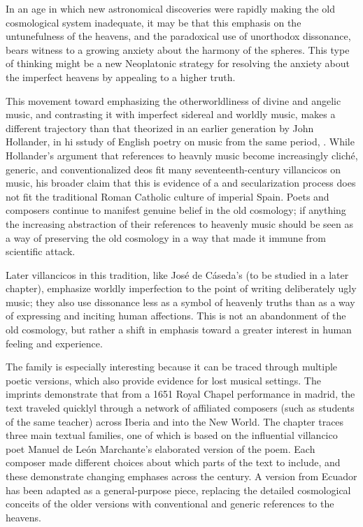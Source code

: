 \documentclass[tt]{vcbook-proposal}
\begin{document}
In an age in which new astronomical discoveries were rapidly making the old cosmological system inadequate, it may be that this emphasis on the untunefulness of the heavens, and the paradoxical use of unorthodox dissonance, bears witness to a growing anxiety about the harmony of the spheres.
This type of thinking might be a new Neoplatonic strategy for resolving the anxiety about the imperfect heavens by appealing to a higher truth.

This movement toward emphasizing the otherworldliness of divine and angelic music, and contrasting it with imperfect sidereal and worldly music, makes a different trajectory than that theorized in an earlier generation by John Hollander, in hi sstudy of English poetry on music from the same period, .
While Hollander's argument that references to heavnly music become increasingly cliché, generic, and conventionalized deos fit many seventeenth-century villancicos on music, his broader claim that this is evidence of a  and secularization process does not fit the traditional Roman Catholic culture of imperial Spain.
Poets and composers continue to manifest genuine belief in the old cosmology; if anything the increasing abstraction of their references to heavenly music should be seen as a way of preserving the old cosmology in a way that made it immune from scientific attack.

Later villancicos in this tradition, like José de Cáseda's  (to be studied in a later chapter), emphasize worldly imperfection to the point of writing deliberately ugly music; they also use dissonance less as a symbol of heavenly truths than as a way of expressing and inciting human affections.
This is not an abandonment of the old cosmology, but rather a shift in emphasis toward a greater interest in human feeling and experience.

The  family is especially interesting because it can be traced through multiple poetic versions, which also provide evidence for lost musical settings.
The imprints demonstrate that from a 1651 Royal Chapel performance in madrid, the text traveled quicklyl through a network of affiliated composers (such as students of the same teacher) across Iberia and into the New World. 
The chapter traces three main textual families, one of which is based on the influential villancico poet Manuel de León Marchante's elaborated version of the poem. 
Each composer made different choices about which parts of the text to include, and these demonstrate changing emphases across the century.
A version from Ecuador has been adapted as a general-purpose piece, replacing the detailed cosmological conceits of the older versions with conventional and generic references to the heavens.
\end{document}
